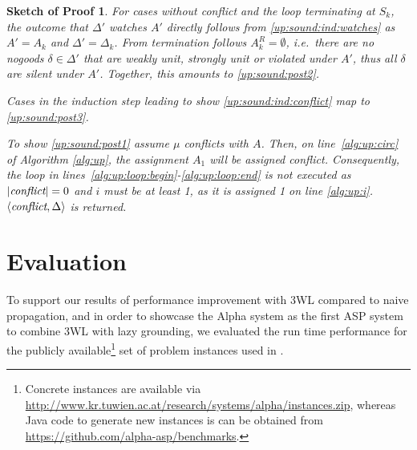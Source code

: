 \documentclass{vutinfth} %
\newtheorem{proof-sketch}{Sketch of Proof}[chapter]
\newtheorem{theorem}{Theorem}[chapter]
\newcommand{\ass}{A}
\newcommand{\sgl}{\mu}
\begin{document}
\begin{proof-sketch}
For cases without conflict and the loop terminating at $S_k$, the outcome that $\Delta'$ watches $A'$ directly follows from \ref{up:sound:ind:watches} as $\ass' = \ass_k$ and $\Delta' = \Delta_k$. From termination follows $A_k^R = \emptyset$, i.e.~there are no nogoods $\delta \in \Delta'$ that are weakly unit, strongly unit or violated under $\ass'$, thus all $\delta$ are silent under $\ass'$. Together, this amounts to \ref{up:sound:post2}.

Cases in the induction step leading to show \ref{up:sound:ind:conflict} map to \ref{up:sound:post3}.

To show \ref{up:sound:post1} assume $\sgl$ conflicts with $\ass$. Then, on line~\ref{alg:up:circ} of Algorithm \ref{alg:up}, the assignment $A_1$ will be assigned \emph{conflict}. Consequently, the loop in lines~\ref{alg:up:loop:begin}-\ref{alg:up:loop:end} is not executed as $|\emph{conflict}| = 0$ and $i$ must be at least 1, as it is assigned 1 on line \ref{alg:up:i}. $\langle \emph{conflict}, \Delta \rangle$ is returned.
\end{proof-sketch}




\chapter{Evaluation}
\label{chap:eval}

To support our results of performance improvement with 3WL compared to naive propagation, and in order to showcase the Alpha system as the first ASP system to combine 3WL with lazy grounding, we evaluated the run time performance for the publicly available\footnote{Concrete instances are available via \url{http://www.kr.tuwien.ac.at/research/systems/alpha/instances.zip}, whereas Java code to generate new instances is can be obtained from \url{https://github.com/alpha-asp/benchmarks}.} set of problem instances used in \cite{alpha-techniques}.
\end{document}
